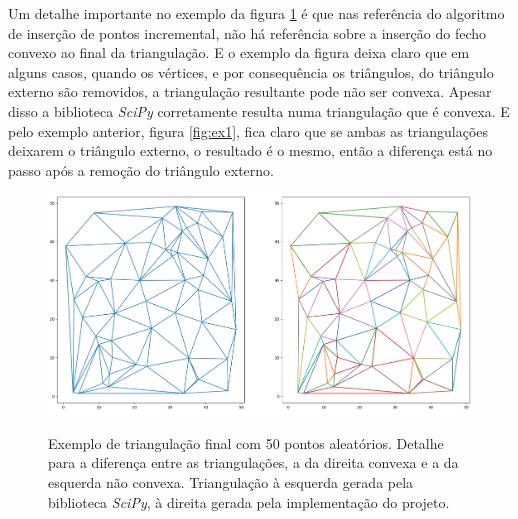 \documentclass[a4paper]{article}
\begin{document}
Um detalhe importante no exemplo da figura \ref{fig:ex1_not_convex} é que nas referência do algoritmo de inserção de pontos incremental, não há referência sobre a inserção do fecho convexo ao final da triangulação. E o exemplo da figura deixa claro que em alguns casos, quando os vértices, e por consequência os triângulos, do triângulo externo são removidos, a triangulação resultante pode não ser convexa. Apesar disso a biblioteca \textit{SciPy} corretamente resulta numa triangulação que é convexa. E pelo exemplo anterior, figura \ref{fig:ex1}, fica claro que se ambas as triangulações deixarem o triângulo externo, o resultado é o mesmo, então a diferença está no passo após a remoção do triângulo externo.


\begin{figure}[H]
	\centering
	\includegraphics[width=1.0\textwidth]{./imgs/ex1_not_convex.png}
	\label{fig:ex1_not_convex} 
	\caption[caption]{Exemplo de triangulação final com 50 pontos aleatórios. Detalhe para a diferença entre as triangulações, a da direita convexa e a da esquerda não convexa. Triangulação à esquerda gerada pela biblioteca \textit{SciPy}, à direita gerada pela implementação do projeto.}
\end{figure}
\end{document}
